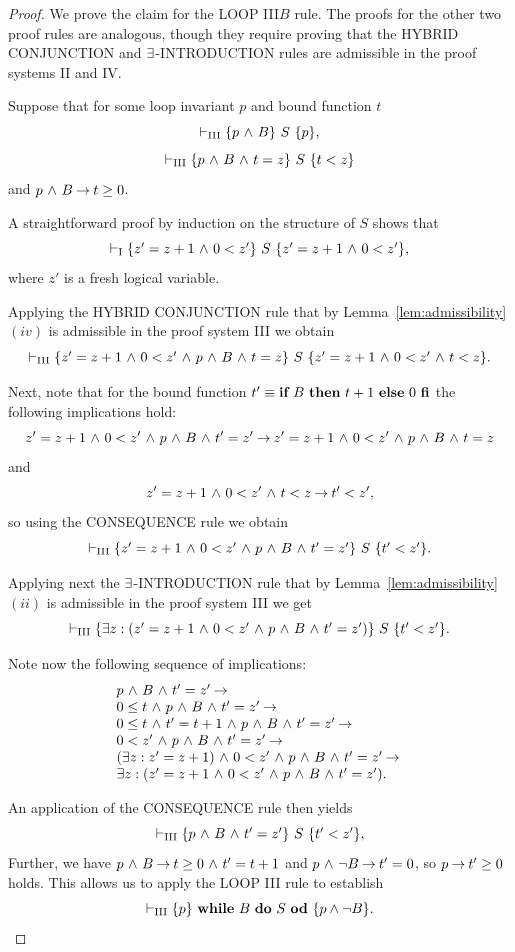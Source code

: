 \documentclass[runningheads]{llncs}       %
\begin{document}
\begin{proof}
  We prove the claim for the LOOP III$B$ rule. The proofs for the
  other two proof rules are analogous, though they require proving
  that the HYBRID CONJUNCTION and $\te$-INTRODUCTION rules are
  admissible in the proof systems II and IV.

  Suppose that for some loop invariant $p$ and bound function $t$
\[
\vdash_{\rm{III}}  \HT{p \A B}{S}{p},
\]
\[
\vdash_{\rm{III}}  \HT{p \A B \A t=z}{S}{t<z}
\]
and
$p \A B \ra t \geq 0$.

A straightforward proof by induction on the structure of $S$
shows that
\[
\vdash_{\rm{I}}  \HT{z' = z+1 \A 0 < z'}{S}{z' = z+1 \A 0 < z'},
\]
where $z'$ is a fresh logical variable.

Applying the HYBRID CONJUNCTION rule that by Lemma~\ref{lem:admissibility}$(iv)$
is admissible in the proof system III
we obtain
\[
  \vdash_{\rm{III}}  \HT{z' = z+1 \A 0 < z' \A p \A B \A t=z}{S}{z' = z+1 \A 0 < z' \A t<z}.
\]

Next, note that for the bound function $t' \equiv \ITE{B}{t+1}{0}$
the following implications hold:
\[
  z' = z+1 \A 0 < z' \A p \A B \A t'=z' \ra
    z' = z+1 \A 0 < z' \A p \A B \A t=z
\]
and
\[
  z' = z+1 \A 0 < z' \A t<z \ra t' < z',
\]
so using the CONSEQUENCE rule we obtain
\[
  \vdash_{\rm{III}}  \HT{z' = z+1 \A 0 < z' \A p \A B \A t'=z'}{S}{t'<z'}.
\]

Applying next the $\te$-INTRODUCTION rule that by Lemma~\ref{lem:admissibility}$(ii)$
is admissible in the proof system III we get
\[
  \vdash_{\rm{III}}  \HT{\te z: (z' = z+1 \A 0 < z' \A p \A B \A t'=z')}{S}{t'<z'}.
\]

Note now the following sequence of implications:
\[
  \begin{array}{l}
    p \A B \A t'=z' \ra \\
    0 \leq t \A p \A B \A t'=z' \ra \\
    0 \leq t \A t' = t+1 \A p \A B \A t'=z' \ra \\
    0 < z' \A p \A B \A t'=z' \ra \\
    (\te z: z' = z+1) \A 0 < z' \A p \A B \A t'=z'  \ra \\
    \te z: (z' = z+1 \A 0 < z' \A p \A B \A t'=z'). 
  \end{array}
\]

An application of the CONSEQUENCE rule then yields
\[
\vdash_{\rm{III}}  \HT{p \A B \A t'=z'}{S}{t'<z'},
\]
Further, we have $p \A B \ra t \geq 0 \A t' = t+1$ and 
$p \A \neg B \ra t' = 0$, so 
$p \ra t' \geq 0$ holds.
This allows us to apply the LOOP III rule to establish
\[
\vdash_{\rm{III}}  \HT{p}{\WDD{B}{S}}{p \wedge \neg B}.
\]
\HB  
\end{proof}

%
\end{document}
